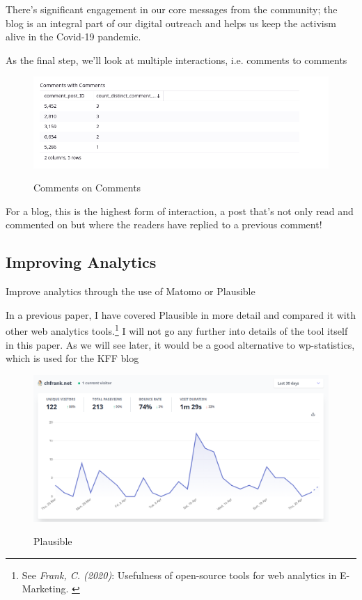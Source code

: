 There's significant engagement in our core messages from the community; the blog is an integral part of our digital outreach and helps us keep the activism alive in the Covid-19 pandemic.

As the final step, we'll look at multiple interactions, i.e. comments to comments

\begin{figure}[H]
\centering
\caption {Comments on Comments}
\includegraphics[width=\linewidth]{images/figure19.png}
\label{fig:commentsComment}
\end{figure}

For a blog, this is the highest form of interaction, a post that's not only read and commented on but where the readers have replied to a previous comment! 

\subsection{Improving Analytics}

Improve analytics through the use of Matomo or Plausible

In a previous paper, I have covered Plausible in more detail and compared it with other web analytics tools.\footnote{See \textit{Frank, C. (2020)}: Usefulness of open-source tools for web analytics in E-Marketing. \cite{previousPaper}} I will not go any further into details of the tool itself in this paper. As we will see later, it would be a good alternative to wp-statistics, which is used for the KFF blog

\begin{figure}[H]
\centering
\caption {Plausible}
\includegraphics[width=\linewidth]{images/plausible.png}
\label{fig:plausible}
\end{figure}

